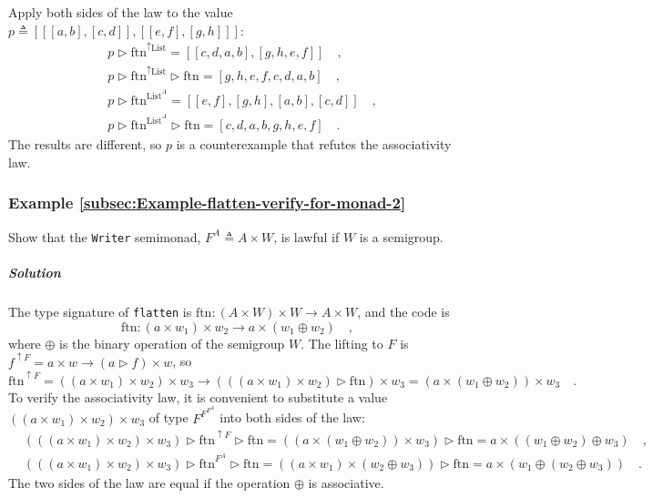 Apply both sides of the law to the value $p\triangleq\left[\left[\left[a,b\right],\left[c,d\right]\right],\left[\left[e,f\right],\left[g,h\right]\right]\right]$:
\begin{align*}
 & p\triangleright\text{ftn}^{\uparrow\text{List}}=\left[\left[c,d,a,b\right],\left[g,h,e,f\right]\right]\quad,\\
 & p\triangleright\text{ftn}^{\uparrow\text{List}}\triangleright\text{ftn}=\left[g,h,e,f,c,d,a,b\right]\quad,\\
 & p\triangleright\text{ftn}^{\text{List}^{A}}=\left[\left[e,f\right],\left[g,h\right],\left[a,b\right],\left[c,d\right]\right]\quad,\\
 & p\triangleright\text{ftn}^{\text{List}^{A}}\triangleright\text{ftn}=\left[c,d,a,b,g,h,e,f\right]\quad.
\end{align*}
The results are different, so $p$ is a counterexample that refutes
the associativity law.

\subsubsection{Example \label{subsec:Example-flatten-verify-for-monad-2}\ref{subsec:Example-flatten-verify-for-monad-2}}

Show that the \lstinline!Writer! semimonad, $F^{A}\triangleq A\times W$,
is lawful if $W$ is a semigroup.

\subparagraph{Solution}

The type signature of \lstinline!flatten! is $\text{ftn}:\left(A\times W\right)\times W\rightarrow A\times W$,
and the code is
\[
\text{ftn}:\left(a\times w_{1}\right)\times w_{2}\rightarrow a\times\left(w_{1}\oplus w_{2}\right)\quad,
\]
where $\oplus$ is the binary operation of the semigroup $W$. The
lifting to $F$ is $f^{\uparrow F}=a\times w\rightarrow\left(a\triangleright f\right)\times w$,
so
\[
\text{ftn}^{\uparrow F}=\left(\left(a\times w_{1}\right)\times w_{2}\right)\times w_{3}\rightarrow\left(\left(\left(a\times w_{1}\right)\times w_{2}\right)\triangleright\text{ftn}\right)\times w_{3}=\left(a\times\left(w_{1}\oplus w_{2}\right)\right)\times w_{3}\quad.
\]
To verify the associativity law, it is convenient to substitute a
value $\left(\left(a\times w_{1}\right)\times w_{2}\right)\times w_{3}$
of type $F^{F^{F^{A}}}$ into both sides of the law:
\begin{align*}
 & \left(\left(\left(a\times w_{1}\right)\times w_{2}\right)\times w_{3}\right)\triangleright\text{ftn}^{\uparrow F}\triangleright\text{ftn}=\left(\left(a\times\left(w_{1}\oplus w_{2}\right)\right)\times w_{3}\right)\triangleright\text{ftn}=a\times\left(\left(w_{1}\oplus w_{2}\right)\oplus w_{3}\right)\quad,\\
 & \left(\left(\left(a\times w_{1}\right)\times w_{2}\right)\times w_{3}\right)\triangleright\text{ftn}^{F^{A}}\triangleright\text{ftn}=\left(\left(a\times w_{1}\right)\times\left(w_{2}\oplus w_{3}\right)\right)\triangleright\text{ftn}=a\times\left(w_{1}\oplus\left(w_{2}\oplus w_{3}\right)\right)\quad.
\end{align*}
The two sides of the law are equal if the operation $\oplus$ is associative.

